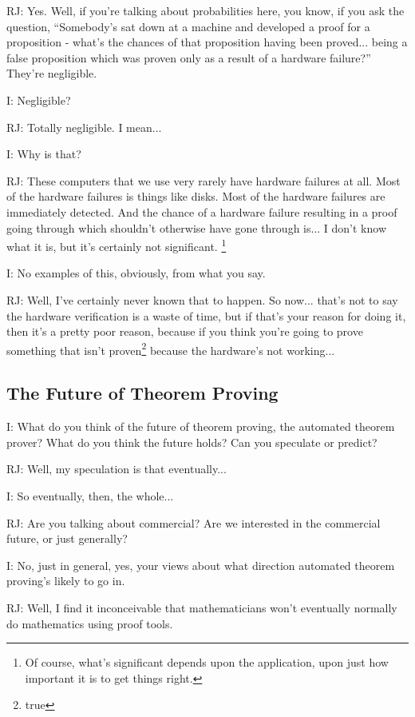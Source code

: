 \documentclass[10pt,titlepage]{book}
\begin{document}
RJ: Yes.
Well, if you're talking about probabilities here, you know, if you ask the question, ``Somebody's sat down at a machine and developed a proof for a proposition - what's the chances of that proposition having been proved... being a false proposition which was proven only as a result of a hardware failure?''
They're negligible.

I: Negligible?

RJ: Totally negligible.
I mean...

I: Why is that?

RJ: These computers that we use very rarely have hardware failures at all.
Most of the hardware failures is things like disks.
Most of the hardware failures are immediately detected.
And the chance of a hardware failure resulting in a proof going through which shouldn't otherwise have gone through is...  I don't know what it is, but it's certainly not significant.%
\footnote{
Of course, what's significant depends upon the application, upon just how important it is to get things right.
}

I: No examples of this, obviously, from what you say.

RJ: Well, I've certainly never known that to happen.
So now... that's not to say the hardware verification is a waste of time, but if that's your reason for doing it, then it's a pretty poor reason, because if you think you're going to prove something that isn't proven\footnote{true} because the hardware's not working...

\subsection{The Future of Theorem Proving}

I: What do you think of the future of theorem proving, the automated theorem prover?
What do you think the future holds?
Can you speculate or predict?

RJ: Well, my speculation is that eventually...

I: So eventually, then, the whole...

RJ: Are you talking about commercial?
Are we interested in the commercial future, or just generally?

I: No, just in general, yes, your views about what direction automated theorem proving's likely to go in.

RJ: Well, I find it inconceivable that mathematicians won't eventually normally do mathematics using proof tools.
\end{document}
